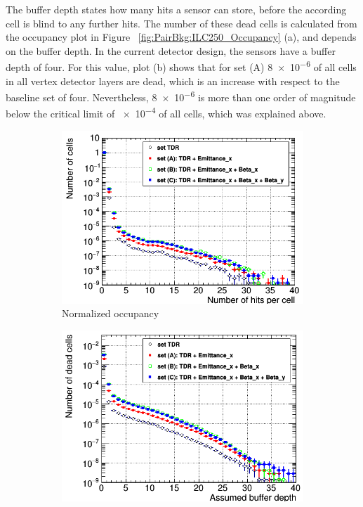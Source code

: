 The buffer depth states how many hits a sensor can store, before the according cell is blind to any further hits.
The number of these dead cells is calculated from the occupancy plot in Figure ~\ref{fig:PairBkg:ILC250_Occupancy} (a), and depends on the buffer depth.
In the current detector design, the sensors have a buffer depth of four. 
For this value, plot (b) shows that for set (A) \num{8e-6} of all cells in all vertex detector layers are dead, which is an increase with respect to the baseline set of four.
Nevertheless, \num{8e-6} is more than one order of magnitude below the critical limit of \num{e-4} of all cells, which was explained above.
 \begin{figure}[h]
 \centering
  \begin{subfigure}[b]{0.49\textwidth}
   \centering
    \includegraphics[width=\textwidth]{Figures/Pairs/Occupancy_Comparison_All_layers_wrt_cells_ILC250_Comparison_ALL_SETS_5T_w_antiDiD_LEG.png}
   \caption{Normalized occupancy}
   \end{subfigure}
   \hfill
    \begin{subfigure}[b]{0.49\textwidth}
   \centering
    \includegraphics[width=\textwidth]{Figures/Pairs/Occupancy_Comparison_All_layers_deadcells_ILC250_Comparison_ALL_SETS_5T_w_antiDiD_LEG.png}

\end{subfigure}
\end{figure}
